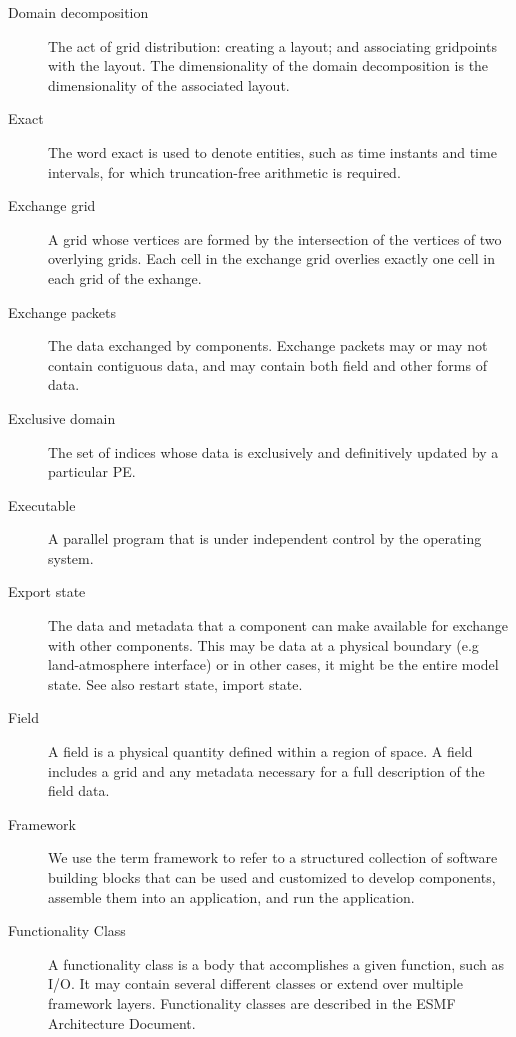 \begin{description}
\item[Domain decomposition] \label{glos:DomainDecomp} The act of grid 
  distribution: creating a layout; and associating gridpoints with the layout. 
  The dimensionality of the domain decomposition is the dimensionality of 
  the associated layout.

\item [Exact] \label{glos:Exact} The word exact is used
to denote entities, such as time instants and time intervals, for which truncation-free arithmetic is required. 

\item[Exchange grid] \label{glos:ExchangeGrid} A grid whose vertices are
formed by the intersection of the vertices of two overlying grids.  Each 
cell in the exchange grid overlies exactly one cell in each grid of the 
exhange.

\item[Exchange packets] \label{glos:EP} The data exchanged by components.  
  Exchange packets may or may not contain contiguous data, and may contain 
  both field and other forms of data.

\item[Exclusive domain] \label{glos:ExcDomain} The set of indices whose 
  data is exclusively and definitively updated by a particular PE.

\item[Executable] \label{glos:Exec} 
  A parallel program that is under independent control by the operating 
  system.

\item[Export state] \label{glos:ExportState} The data and 
  metadata that a component can make available for exchange 
  with other components. This may be data at a physical boundary 
  (e.g land-atmosphere interface) or in other cases, it might be the 
  entire model state.  See also restart state, import state.

\item[Field] \label{glos:Field} A field is a physical quantity
  defined within a region of space.  A field includes a grid 
  and any metadata necessary for a full description of the field data.

\item[Framework] \label{glos:Framework} We use the term framework to 
refer to a structured collection of software building blocks that can be used 
and customized to develop components, assemble them into an application, and 
run the application.

\item[Functionality Class] \label{glos:FuncClass}
A functionality class is a body that accomplishes a given function, such
as I/O. It may contain several different classes or extend over multiple
framework layers. Functionality classes are described in the ESMF Architecture
Document.


\end{description}
